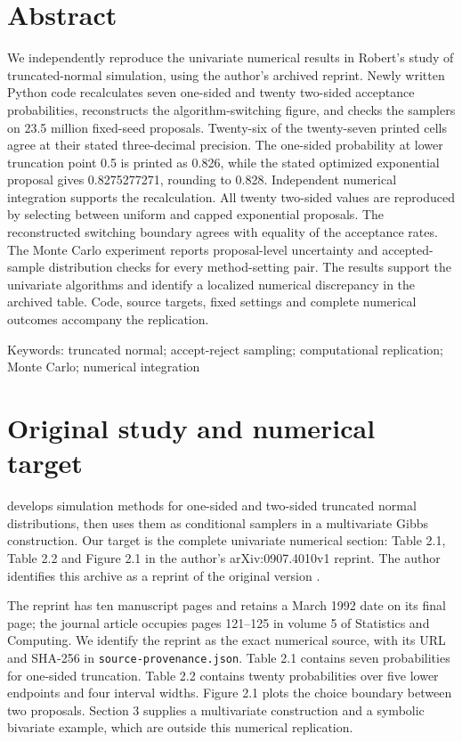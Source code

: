 \section*{Abstract}

We independently reproduce the univariate numerical results in Robert's study of truncated-normal simulation, using the author's archived reprint. Newly written Python code recalculates seven one-sided and twenty two-sided acceptance probabilities, reconstructs the algorithm-switching figure, and checks the samplers on 23.5 million fixed-seed proposals. Twenty-six of the twenty-seven printed cells agree at their stated three-decimal precision. The one-sided probability at lower truncation point 0.5 is printed as 0.826, while the stated optimized exponential proposal gives 0.8275277271, rounding to 0.828. Independent numerical integration supports the recalculation. All twenty two-sided values are reproduced by selecting between uniform and capped exponential proposals. The reconstructed switching boundary agrees with equality of the acceptance rates. The Monte Carlo experiment reports proposal-level uncertainty and accepted-sample distribution checks for every method-setting pair. The results support the univariate algorithms and identify a localized numerical discrepancy in the archived table. Code, source targets, fixed settings and complete numerical outcomes accompany the replication.

{\small\sffamily Keywords: truncated normal; accept-reject sampling; computational replication; Monte Carlo; numerical integration\par}

\section{Original study and numerical target}

\citet{robert1995} develops simulation methods for one-sided and two-sided truncated normal distributions, then uses them as conditional samplers in a multivariate Gibbs construction. Our target is the complete univariate numerical section: Table 2.1, Table 2.2 and Figure 2.1 in the author's arXiv:0907.4010v1 reprint. The author identifies this archive as a reprint of the original version \cite{robert2009}.

The reprint has ten manuscript pages and retains a March 1992 date on its final page; the journal article occupies pages 121–125 in volume 5 of Statistics and Computing. We identify the reprint as the exact numerical source, with its URL and SHA-256 in \texttt{source-\allowbreak{}provenance.\allowbreak{}json}. Table 2.1 contains seven probabilities for one-sided truncation. Table 2.2 contains twenty probabilities over five lower endpoints and four interval widths. Figure 2.1 plots the choice boundary between two proposals. Section 3 supplies a multivariate construction and a symbolic bivariate example, which are outside this numerical replication.

